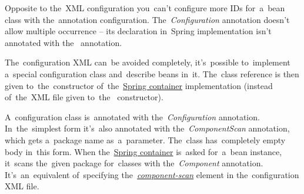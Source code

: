\warning Opposite to the~XML configuration you~can't configure more IDs for~a~bean class with the~annotation configuration.
The~\textit{Configuration} annotation doesn't allow multiple occurrence -- its declaration in~Spring implementation isn't annotated with the~ annotation.
\newpage

\label{iocnoxml}
The~configuration XML can~be avoided completely, it's~possible to~implement a~special configuration class and~describe beans in~it.
The~class reference is then given to~the~constructor of~the~\hyperref[springcontainrer]{Spring container} implementation  (instead of~the~XML file given to~the~ constructor).

A~configuration class is~annotated with the~\textit{Configuration} annotation.
In~the~simplest form it's~also annotated with the~\textit{ComponentScan} annotation, which gets a~package name as~a~parameter.
The~class has~completely empty body in~this form.
When the~\hyperref[springcontainrer]{Spring container} is~asked for~a~bean instance, it~scans the~given package for~classes with the~\textit{Component} annotation.
It's~an~equivalent of~specifying the~\hyperref[iocannotations]{\textit{component-scan}} element in the~configuration XML file.\\

